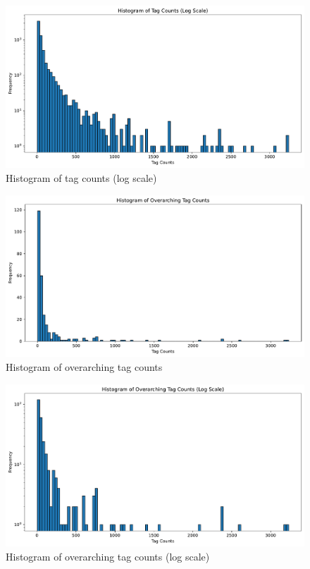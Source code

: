 \begin{figure}[h]
    \centering
    \includegraphics[width=\textwidth]{figures/histogram_tag_counts_log.pdf}
    \caption{Histogram of tag counts (log scale)}
    \label{fig:histogram_tag_counts_log}
\end{figure}

\begin{figure}[h]
    \centering
    \includegraphics[width=\textwidth]{figures/histogram_overarching_tag_counts.pdf}
    \caption{Histogram of overarching tag counts}
    \label{fig:histogram_overarching_tag_counts}
\end{figure}

\begin{figure}[h]
    \centering
    \includegraphics[width=\textwidth]{figures/histogram_overarching_tag_counts_log.pdf}
    \caption{Histogram of overarching tag counts (log scale)}
    \label{fig:histogram_overarching_tag_counts_log}
\end{figure}

